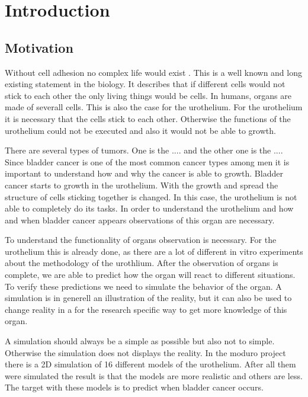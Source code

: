 \chapter{Introduction}
\section{Motivation}
Without cell adhesion no complex life would exist \cite{REF}.
This is a well known and long existing statement in the biology. It describes that if different cells would not stick to each other the only living things would be cells. 
In humans, organs are made of severall cells. This is also the case for the urothelium. For the urothelium it is necessary that the cells stick to each other. Otherwise the functions of the urothelium could not be executed and also it would not be able to growth.%

There are several types of tumors. One is the .... and the other one is the .... Since bladder cancer is one of the most common cancer types among men it is important to understand how and why the cancer is able to growth. Bladder cancer starts to growth in the urothelium. With the growth and spread the structure of cells sticking together is changed. In this case, the urothelium is not able to completely do its tasks. In order to understand the urothelium and how and when bladder cancer appears observations of this organ are necessary. 

To understand the functionality of organs observation is necessary. For the urothelium this is already done, as there are a lot of different in vitro experiments about the methodology of the urothlium. After the observation of organs is complete, we are able to predict how the organ will react to different situations. To verify these predictions we need to simulate the behavior of the organ. A simulation is in generell an illustration of the reality, but it can also be used to change reality in a for the research specific way to get more knowledge of this organ.

A simulation should always be a simple as possible but also not to simple. Otherwise the simulation does not displays the reality. In the moduro project there is a 2D simulation of 16 different models of the urothelium. After all them were simulated the result is that the models are more realistic and others are less. The target with these models is to predict when bladder cancer occurs.

